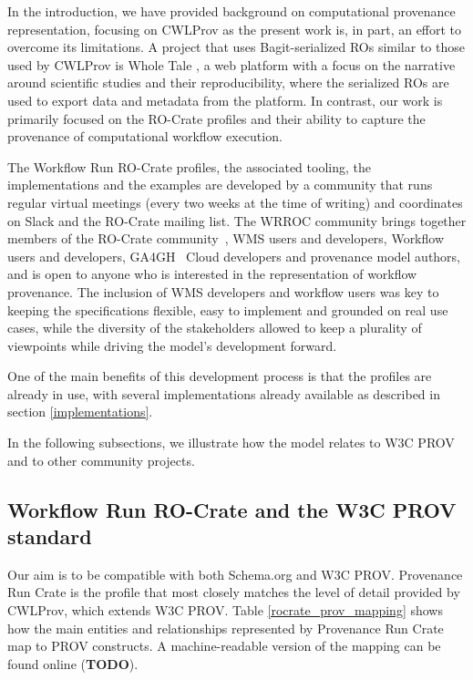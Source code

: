\documentclass[10pt,letterpaper]{article}
\begin{document}
In the introduction, we have provided background on computational provenance representation, focusing on CWLProv as the present work is, in part, an effort to overcome its limitations.
A project that uses Bagit-serialized ROs similar to those used by CWLProv is Whole Tale
\cite{Chard 2019}, a web platform with a focus on the narrative around scientific studies and their reproducibility, where the serialized ROs are used to export data and metadata from the platform.
In contrast, our work is primarily focused on the RO-Crate profiles and their ability to capture the provenance of computational workflow execution.

The Workflow Run RO-Crate profiles, the associated tooling, the implementations and the examples are developed by a community that runs regular virtual meetings (every two weeks at the time of writing) and coordinates on Slack and the RO-Crate mailing list.
The WRROC community brings together members of the RO-Crate community~\cite{Soiland-Reyes 2022a}, WMS users and developers, Workflow users and developers, GA4GH~\cite{Rehm 2021} Cloud developers and provenance model authors, and is open to anyone who is interested in the representation of workflow provenance.
The inclusion of WMS developers and workflow users was key to keeping the specifications flexible, easy to implement and grounded on real use cases, while the diversity of the stakeholders allowed to keep a plurality of viewpoints while driving the model's development forward.

One of the main benefits of this development process is that the profiles are already in use, with several implementations already available as described in section \ref{implementations}.

In the following subsections, we illustrate how the model relates to W3C PROV and to other community projects.

\subsection{Workflow Run RO-Crate and the W3C PROV standard}

Our aim is to be compatible with both Schema.org and W3C PROV. Provenance Run Crate is the profile that most closely matches the level of detail provided by CWLProv, which extends W3C PROV. Table \ref{rocrate_prov_mapping} shows how the main entities and relationships represented by Provenance Run Crate map to PROV constructs. A machine-readable version of the mapping can be found online (\textbf{TODO}).
\end{document}
